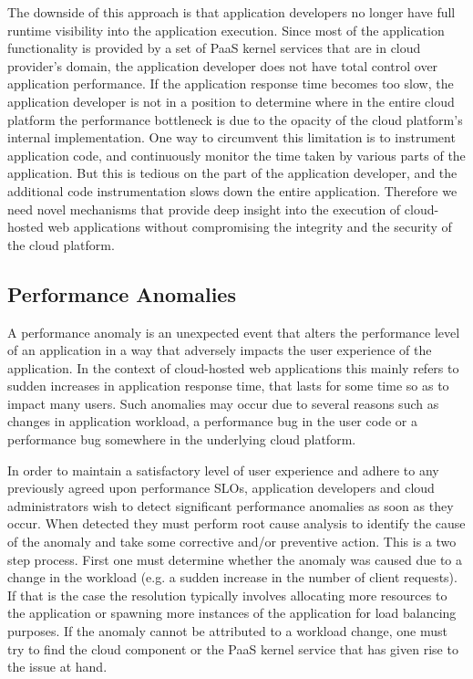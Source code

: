 The downside of this approach is that application developers no longer have full runtime visibility
into the application execution. Since most of the application functionality is provided by a set 
of PaaS kernel services that are in cloud provider's domain, the application
developer does not have total control over application performance. If the application 
response time becomes too slow, the application developer is not in a position to determine
where in the entire cloud platform the performance bottleneck is due to the opacity of the cloud
platform's internal implementation. One way to circumvent this 
limitation is to instrument application code, and continuously monitor the time taken by various
parts of the application. But this is tedious on the part of the application developer, and
the additional code instrumentation slows down the entire application. Therefore we need
novel mechanisms that provide deep insight into the execution of cloud-hosted web
applications without compromising the integrity and the security of the cloud platform.

\subsection{Performance Anomalies}
A performance anomaly is an unexpected event that alters the performance level of an
application in a way that adversely impacts the user experience of the application. In the context
of cloud-hosted web applications this mainly refers to sudden increases in application
response time, that lasts for some time so as to impact many users. Such anomalies 
may occur due to several reasons such as changes in
application workload, a performance bug in the user code or a performance bug somewhere
in the underlying cloud platform.

In order to maintain a satisfactory level of user experience and adhere to any previously
agreed upon performance SLOs, application developers and cloud administrators wish
to detect significant performance anomalies as soon as they occur. When detected they
must perform root cause analysis to identify the cause of the anomaly and take some
corrective and/or preventive action. This is a two step process. First one must determine
whether the anomaly was caused due to a change in the workload (e.g. a sudden 
increase in the number of client requests). If that is the case
the resolution typically involves allocating more resources to the application or spawning
more instances of the application for load balancing purposes. If the anomaly cannot be 
attributed to a workload change, one must try to find the cloud component or the PaaS kernel
service that has given rise to the issue at hand.

